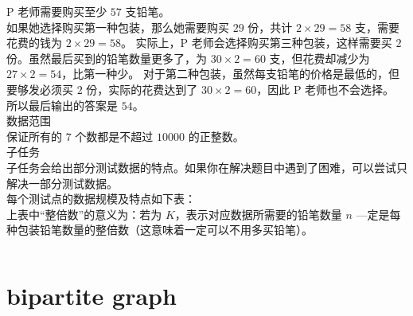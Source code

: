 \documentclass[12pt,twiside,a4paper]{ctexbook}
\numberwithin{chapter}{part}
\begin{document}
P 老师需要购买至少 $57$ 支铅笔。\\
如果她选择购买第一种包装，那么她需要购买 $29$ 份，共计 $2 \times 29 = 58$ 支，需要花费的钱为 $2 \times 29 = 58$。
实际上，P 老师会选择购买第三种包装，这样需要买 $2$ 份。虽然最后买到的铅笔数量更多了，为 $30 \times 2 = 60$ 支，但花费却减少为 $27 \times 2 = 54$，比第一种少。
对于第二种包装，虽然每支铅笔的价格是最低的，但要够发必须买 $2$ 份，实际的花费达到了 $30  \times 2 = 60$，因此 P 老师也不会选择。
所以最后输出的答案是 $54$。\\
数据范围\\
保证所有的 $7$ 个数都是不超过 $10000$ 的正整数。\\
子任务\\
子任务会给出部分测试数据的特点。如果你在解决题目中遇到了困难，可以尝试只解决一部分测试数据。\\
每个测试点的数据规模及特点如下表：\\
上表中“整倍数”的意义为：若为 $K$，表示对应数据所需要的铅笔数量 $n$ —定是每种包装铅笔数量的整倍数（这意味着一定可以不用多买铅笔）。
\begin{lstlisting}[language=C++,breaklines=true]

\end{lstlisting}

\chapter{bipartite graph}
\end{document}

